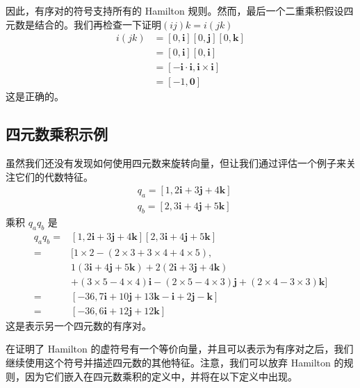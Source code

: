 因此，有序对的符号支持所有的 Hamilton 规则。然而，最后一个二重乘积假设四元数是结合的。我们再检查一下证明$(ij) k=i(j k)$
$$
    \begin{aligned}
        i(j k) & =[0, \mathbf{i}][0, \mathbf{j}][0, \mathbf{k}]                \\
               & =[0, \mathbf{i}][0, \mathbf{i}]                               \\
               & =[-\mathbf{i} \cdot \mathbf{i}, \mathbf{i} \times \mathbf{i}] \\
               & =[-1, \mathbf{0}]
    \end{aligned}
$$
这是正确的。

\subsection{四元数乘积示例}
虽然我们还没有发现如何使用四元数来旋转向量，但让我们通过评估一个例子来关注它们的代数特征。
$$
    \begin{aligned}
         & q_{a}=[1,2 \mathbf{i}+3 \mathbf{j}+4 \mathbf{k}] \\
         & q_{b}=[2,3 \mathbf{i}+4 \mathbf{j}+5 \mathbf{k}]
    \end{aligned}
$$
乘积 $q_{a} q_{b}$ 是
$$
    \begin{aligned}
        q_{a} q_{b}= & {[1,2 \mathbf{i}+3 \mathbf{j}+4 \mathbf{k}][2,3 \mathbf{i}+4 \mathbf{j}+5 \mathbf{k}] }                    \\
        =            & {[1 \times 2-(2 \times 3+3 \times 4+4 \times 5),}                                                          \\
                     & 1(3 \mathbf{i}+4 \mathbf{j}+5 \mathbf{k})+2(2 \mathbf{i}+3 \mathbf{j}+4 \mathbf{k})                        \\
                     & +(3 \times 5-4 \times 4) \mathbf{i}-(2 \times 5-4 \times 3) \mathbf{j}+(2 \times 4-3 \times 3) \mathbf{k}] \\
        =            & {[-36,7 \mathbf{i}+10 \mathbf{j}+13 \mathbf{k}-\mathbf{i}+2 \mathbf{j}-\mathbf{k}] }                       \\
        =            & {[-36,6 \mathbf{i}+12 \mathbf{j}+12 \mathbf{k}] }
    \end{aligned}
$$
这是表示另一个四元数的有序对。


在证明了 Hamilton 的虚符号有一个等价向量，并且可以表示为有序对之后，我们继续使用这个符号并描述四元数的其他特征。注意，我们可以放弃 Hamilton 的规则，因为它们嵌入在四元数乘积的定义中，并将在以下定义中出现。


